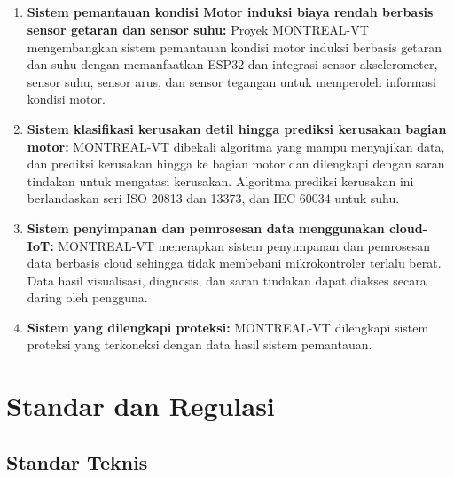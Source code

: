 \documentclass{elsinta}
\begin{document}
\subsection{\ProjectContribsTitle}
\begin{enumerate}
    \item \textbf{Sistem pemantauan kondisi Motor induksi biaya rendah berbasis sensor getaran dan sensor suhu:} Proyek MONTREAL-VT mengembangkan sistem pemantauan kondisi motor induksi berbasis getaran dan suhu dengan memanfaatkan ESP32 dan integrasi sensor akselerometer, sensor suhu, sensor arus, dan sensor tegangan untuk memperoleh informasi kondisi motor.
    \item \textbf{Sistem klasifikasi kerusakan detil hingga prediksi kerusakan bagian motor:} MONTREAL-VT dibekali algoritma yang mampu menyajikan data, dan prediksi kerusakan hingga ke bagian motor dan dilengkapi dengan saran tindakan untuk mengatasi kerusakan. Algoritma prediksi kerusakan ini berlandaskan seri ISO 20813 dan 13373, dan IEC 60034 untuk suhu.
    \item \textbf{Sistem penyimpanan dan pemrosesan data menggunakan cloud-IoT:} MONTREAL-VT menerapkan sistem penyimpanan dan pemrosesan data berbasis cloud sehingga tidak membebani mikrokontroler terlalu berat. Data hasil visualisasi, diagnosis, dan saran tindakan dapat diakses secara daring oleh pengguna.
    \item \textbf{Sistem yang dilengkapi proteksi:} MONTREAL-VT dilengkapi sistem proteksi yang terkoneksi dengan data hasil sistem pemantauan.
\end{enumerate}

\section{Standar dan Regulasi}

\subsection{Standar Teknis}
\end{document}
